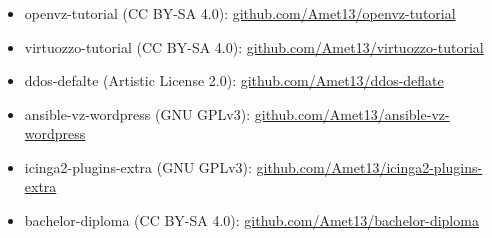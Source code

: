 \begin{frame}
\frametitle{\insertsection}
\begin{itemize}
	\item openvz-tutorial (CC BY-SA 4.0): \href{https://github.com/Amet13/openvz-tutorial}{github.com/Amet13/openvz-tutorial}
	\item virtuozzo-tutorial (CC BY-SA 4.0): \href{https://github.com/Amet13/virtuozzo-tutorial}{github.com/Amet13/virtuozzo-tutorial}
	\item ddos-defalte (Artistic License 2.0): \href{https://github.com/Amet13/ddos-deflate}{github.com/Amet13/ddos-deflate}
	\item ansible-vz-wordpress (GNU GPLv3): \href{https://github.com/Amet13/ansible-vz-wordpress}{github.com/Amet13/ansible-vz-wordpress}
	\item icinga2-plugins-extra (GNU GPLv3): \href{https://github.com/Amet13/icinga2-plugins-extra}{github.com/Amet13/icinga2-plugins-extra}
	\item bachelor-diploma (CC BY-SA 4.0): \href{https://github.com/Amet13/bachelor-diploma}{github.com/Amet13/bachelor-diploma}
\end{itemize}
\end{frame}


\frame[plain]{\titlepage} %
